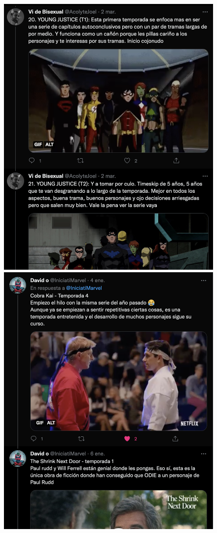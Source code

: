 \begin{figure}[H]
	\centering	
	\includegraphics[scale=0.25]{img/twitter-thread-1.png}
    \includegraphics[scale=0.253]{img/twitter-thread-2.png}

\end{figure}
